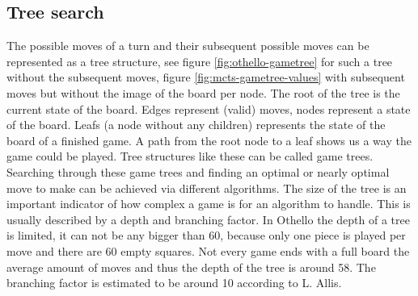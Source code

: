 \documentclass[
11pt, %
english, %
singlespacing, %
headsepline, %
]{MastersDoctoralThesis} %
\begin{document}
\subsection{Tree search}
The possible moves of a turn and their subsequent possible moves can be represented as a tree structure, see figure \ref{fig:othello-gametree} for such a tree without the subsequent moves, figure \ref{fig:mcts-gametree-values} with subsequent moves but without the image of the board per node. The root of the tree is the current state of the board. Edges represent (valid) moves, nodes represent a state of the board. Leafs (a node without any children) represents the state of the board of a finished game. A path from the root node to a leaf shows us a way the game could be played. Tree structures like these can be called game trees. Searching through these game trees and finding an optimal or nearly optimal move to make can be achieved via different algorithms. The size of the tree is an important indicator of how complex a game is for an algorithm to handle. This is usually described by a depth and branching factor. In Othello the depth of a tree is limited, it can not be any bigger than 60, because only one piece is played per move and there are 60 empty squares. Not every game ends with a full board the average amount of moves and thus the depth of the tree is around 58. The branching factor is estimated to be around 10 according to L. Allis\cite{Allis:1994}.
\end{document}
